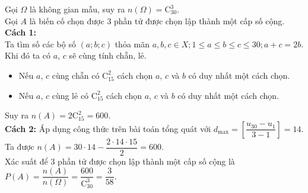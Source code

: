 \begin{vd}
{		\noindent
		Gọi $\Omega $ là không gian mẫu, suy ra $n(\Omega)=\mathrm{C}_{30}^3$.\\
		Gọi $A$ là biến cố chọn được  $3$ phần tử được chọn lập thành một cấp số cộng.\\
		\textbf{Cách 1:}\\
		Ta tìm số các bộ số $(a;b;c)$ thỏa mãn $a,b,c\in X;1\leq a\leq b\leq c\leq 30;a+c=2b$.\\
		Khi đó ta có $a$, $c$ sẽ cùng tính chẵn, lẻ.
		\begin{itemize}
			\item Nếu $a$, $c$ cùng chẵn có $\mathrm{C}_{15}^2$ cách chọn $a$, $c$ và $b$ có duy nhất một cách chọn.
			\item Nếu $a$, $c$ cùng lẻ có $\mathrm{C}_{15}^2$ cách chọn $a$, $c$ và $b$ có duy nhất một cách chọn.
		\end{itemize}
		Suy ra $n(A)=2\mathrm{C}_{15}^2=600$.\\
		\textbf{Cách 2:} Áp dụng công thức trên bài toán tổng quát với $d_\text{max}=\left[\dfrac{u_{30}-u_1}{3-1} \right]=14$.\\
		Ta được $n(A)=30\cdot14-\dfrac{2\cdot14\cdot15}{2}=600$.\\
		Xác suất để $3$ phần tử được chọn lập thành một cấp số cộng là $P(A)=\dfrac{n(A)}{n(\Omega)}=\dfrac{600}{\mathrm{C}_{30}^3}=\dfrac{3}{58}.$
	}
\end{vd}
